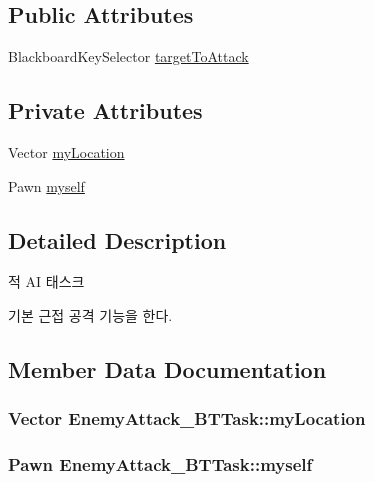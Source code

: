 \subsection*{Public Attributes}
\begin{DoxyCompactItemize}
\item 
Blackboard\+Key\+Selector \hyperlink{class_enemy_attack___b_t_task_a3e66ecf42db2caaa36b45cc0b6116062}{target\+To\+Attack}
\end{DoxyCompactItemize}
\subsection*{Private Attributes}
\begin{DoxyCompactItemize}
\item 
Vector \hyperlink{class_enemy_attack___b_t_task_ab57521e6c6d827822ff6be4f5947e912}{my\+Location}
\item 
Pawn \hyperlink{class_enemy_attack___b_t_task_a547169bbc795a0fc6e6e12601c40cc47}{myself}
\end{DoxyCompactItemize}


\subsection{Detailed Description}
적 AI 태스크 

기본 근접 공격 기능을 한다. 

\subsection{Member Data Documentation}
\subsubsection[{\texorpdfstring{my\+Location}{myLocation}}]{\setlength{\rightskip}{0pt plus 5cm}Vector Enemy\+Attack\+\_\+\+B\+T\+Task\+::my\+Location\hspace{0.3cm}{\ttfamily [private]}}\hypertarget{class_enemy_attack___b_t_task_ab57521e6c6d827822ff6be4f5947e912}{}\label{class_enemy_attack___b_t_task_ab57521e6c6d827822ff6be4f5947e912}
\subsubsection[{\texorpdfstring{myself}{myself}}]{\setlength{\rightskip}{0pt plus 5cm}Pawn Enemy\+Attack\+\_\+\+B\+T\+Task\+::myself\hspace{0.3cm}{\ttfamily [private]}}\hypertarget{class_enemy_attack___b_t_task_a547169bbc795a0fc6e6e12601c40cc47}{}\label{class_enemy_attack___b_t_task_a547169bbc795a0fc6e6e12601c40cc47}
